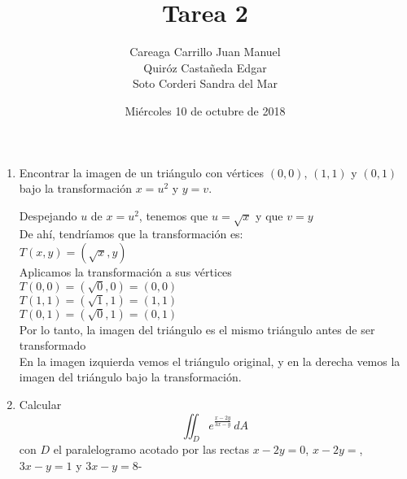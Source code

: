 \documentclass{article}
\begin{document}
    \title{Tarea 2}
    \author{Careaga Carrillo Juan Manuel\\
            Quiróz Castañeda Edgar\\
            Soto Corderi Sandra del Mar}
    \date{Miércoles 10 de octubre de 2018}
    \maketitle
    \begin{enumerate}
    
        \item {
            Encontrar la imagen de un triángulo con vértices $(0,0)$, $(1,1)$
            y $(0,1)$ bajo la transformación $x=u^2$ y $y=v$.

            \color{azul}
            Despejando $u$ de $x=u^2$, tenemos que $u=\sqrt{x}$ y que $v = y$\\
            De ahí, tendríamos que la transformación es:\\
            $T(x,y) = (\sqrt{x} , y)$\\
            
           	Aplicamos la transformación a sus vértices\\
            $T(0,0) = (\sqrt{0}, 0) = (0,0)$\\
            $T(1,1) = (\sqrt{1}, 1) = (1,1)$\\
            $T(0,1) = (\sqrt{0}, 1) = (0,1)$\\
            
            Por lo tanto, la imagen del triángulo es el mismo triángulo antes de ser                           transformado\\
          
                	
        	En la imagen izquierda vemos el triángulo original, y en la derecha vemos 			la imagen del triángulo bajo la transformación.\\
	}        
   


        \item {
            Calcular
            \[
                \iint_{D}{e^{\frac{x-2y}{3x-y}}\,dA}
            \]
            con $D$ el paralelogramo acotado por las rectas $x-2y=0$, $x-2y=$,
            $3x-y=1$ y $3x-y=8$-

}
\end{enumerate}
\end{document}
